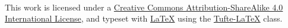 \documentclass[a4paper,oneside,marginals=justified,nobib]{tufte-book}
\newcommand{\monthyear}{\ifcase\month\or January\or February\or March\or 
April\or May\or June\or July\or August\or September\or October\or 
November\or December\fi\space\number\year} %
\begin{document}

\newpage
~\vfill
\thispagestyle{empty}
\setlength{\parindent}{0pt}
\setlength{\parskip}{\baselineskip}

\ccbysa

This work is licensed under a 
\href{http://creativecommons.org/licenses/by-sa/4.0/} {Creative Commons 
	Attribution-ShareAlike 4.0 International License}, and typeset with 
\href{ttps://www.latex-project.org/}{\LaTeX} using the 
\href{https://tufte-latex.github.io/tufte-latex/}{Tufte-LaTeX} class.



\renewcommand{\baselinestretch}{0.75}\normalsize
\tableofcontents %
\listoffigures %
\listoftables %
\listoftodos
\renewcommand{\baselinestretch}{1.0}\normalsize

\end{document}
